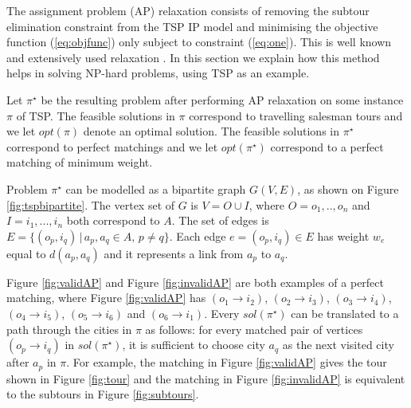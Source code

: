 \documentclass{mprop}
\theoremstyle{definition}
\begin{document}
The assignment problem (AP) relaxation consists of removing the subtour elimination constraint from the TSP IP model and minimising the objective function (\ref{eq:objfunc}) only subject to constraint (\ref{eq:one}). This is well known and extensively used relaxation \cite{Fischetti92,Jonker80,Eastman58,Laporte86}. In this section we explain how this method helps in solving NP-hard problems, using TSP as an example.

Let $\pi^{\star}$ be the resulting problem after performing AP relaxation on some instance $\pi$ of TSP. 
The feasible solutions in $\pi$ correspond to travelling salesman tours and we let $opt(\pi)$ denote an optimal solution. The feasible solutions in $\pi^{\star}$ correspond to perfect matchings and we let $opt(\pi^{\star})$ correspond to a perfect matching of minimum weight.

Problem $\pi^{\star}$ can be modelled as a bipartite graph $G(V,E)$, as shown on Figure \ref{fig:tspbipartite}. The vertex set of $G$ is $V=O \cup I$, where $O = o_{1},..,o_{n}$ and $I = i_{1},...,i_{n}$ both correspond to $A$. The set of edges is $E = \{(o_{p}, i_{q}) \,|\, a_{p},a_{q} \in A,\, p \neq q \}$. Each edge $e = (o_{p}, i_{q}) \in E$ has weight $w_{e}$ equal to $d(a_{p},a_{q})$ and it represents a link from $a_{p}$ to $a_{q}$.

Figure \ref{fig:validAP} and Figure \ref{fig:invalidAP} are both examples of a perfect matching, where Figure \ref{fig:validAP} has $(o_{1} \rightarrow i_{2})$, $(o_{2} \rightarrow i_{3})$, $(o_{3} \rightarrow i_{4})$, $(o_{4} \rightarrow i_{5})$, $(o_{5} \rightarrow i_{6})$ and $(o_{6} \rightarrow i_{1})$.
Every $sol(\pi^{\star})$ can be translated to a path through the cities in $\pi$ as follows: for every matched pair of vertices $(o_{p} \rightarrow i_{q})$ in $sol(\pi^{\star})$, it is sufficient to choose city $a_{q}$ as the next visited city after $a_{p}$ in $\pi$. For example, the matching in Figure \ref{fig:validAP} gives the tour shown in Figure \ref{fig:tour} and the matching in Figure \ref{fig:invalidAP} is equivalent to the subtours in Figure \ref{fig:subtours}.
\end{document}
